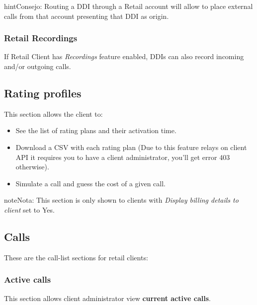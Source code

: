 \documentclass[letterpaper,10pt,spanish]{sphinxmanual}
\begin{document}
\begin{notice}{hint}{Consejo:}
Routing a DDI through a Retail account will allow to place external calls
from that account presenting that DDI as origin.
\end{notice}


\subsubsection{Retail Recordings}
\label{administration_portal/client/retail/ddis:retail-recordings}
If Retail Client has \emph{Recordings} feature enabled, DDIs can also record incoming and/or
outgoing calls.


\subsection{Rating profiles}
\label{administration_portal/client/retail/rating_profiles:rating-profiles}\label{administration_portal/client/retail/rating_profiles::doc}
This section allows the client to:
\begin{itemize}
\item {} 
See the list of rating plans and their activation time.

\item {} 
Download a CSV with each rating plan (Due to this feature relays on client API it requires you to have a client administrator, you'll get error 403 otherwise).

\item {} 
Simulate a call and guess the cost of a given call.

\end{itemize}

\begin{notice}{note}{Nota:}
This section is only shown to clients with \emph{Display billing details to client} set to Yes.
\end{notice}


\subsection{Calls}
\label{administration_portal/client/retail/calls/index::doc}\label{administration_portal/client/retail/calls/index:calls}
These are the call-list sections for retail clients:


\subsubsection{Active calls}
\label{administration_portal/client/retail/calls/active_calls::doc}\label{administration_portal/client/retail/calls/active_calls:active-calls}
This section allows client administrator view \textbf{current active calls}.
\end{document}
